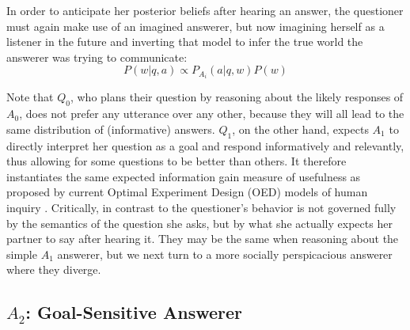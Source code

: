 \documentclass[12pt, floatsintext, jou]{apa6}
\newcommand{\ndg}[1]{\textcolor{Green}{[ndg: #1]}}
\begin{document}
In order to anticipate her posterior beliefs after hearing an answer, the questioner must again make use of an imagined answerer, but now imagining herself as a listener in the future and inverting that model to infer the true world the answerer was trying to communicate:
$$P(w|q,a) \propto P_{A_i}(a| q, w)P(w)$$

Note that $Q_0$, who plans their question by reasoning about the likely responses of $A_0$, does not prefer any utterance over any other, because they will all lead to the same distribution of (informative) answers. $Q_1$, on the other hand, expects $A_1$ to directly interpret her question as a goal and respond informatively and relevantly, thus allowing for some questions to be better than others. It therefore instantiates the same expected information gain measure of usefulness as proposed by current Optimal Experiment Design (OED) models of human inquiry \cite{coenen2018asking}. Critically, in contrast to  the questioner's behavior is not governed fully by the semantics of the question she asks, but by what she actually expects her partner to say after hearing it. They may be the same when reasoning about the simple $A_1$ answerer, but we next turn to a more socially perspicacious answerer where they diverge.

\subsection{$A_2$: Goal-Sensitive Answerer}

%

\end{document}
